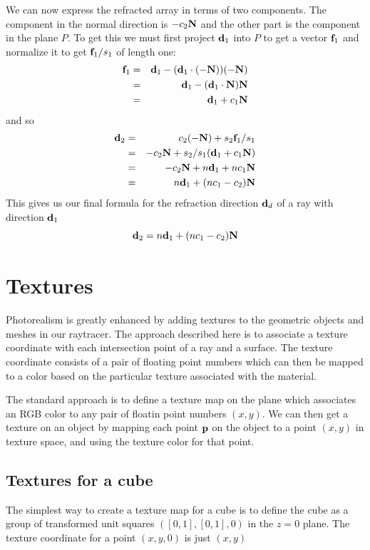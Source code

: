 \documentclass{book}
\newcommand{\vect}[1]{{\bf{ #1}}}
\begin{document}
We can now express the refracted array in terms of two components. The component in the normal
direction is $- c_2 {\vect N}$ and the other part is the component in the plane $P$. To get this
we must first project ${\vect d}_1$ into $P$ to get a vector $\vect{f}_1$
and normalize it to get $\vect{f}_1/s_1$ of length one:
\begin{eqnarray*}
{\vect f}_1 &=& {\vect d}_1 - ({\vect d}_1 \cdot (- {\vect N}))(- {\vect N}) \\
&=& {\vect d}_1 - ({\vect d}_1 \cdot  {\vect N}) {\vect N} \\
&=& {\vect d}_1 + c_1 {\vect N} \\
\end{eqnarray*}
and so
\begin{eqnarray*}
{\vect d}_2 &=& c_2 (- {\vect N}) + s_2 {\vect f_1}/s_1 \\
 &=& - c_2{\vect N} + s_2/s_1 ({\vect d}_1 + c_1{\vect N}) \\
 &=& - c_2{\vect N} + n {\vect d}_1 + n c_1 {\vect N} \\
 &=&  n {\vect d}_1 +  (n c_1 - c_2) {\vect N} \\
\end{eqnarray*}
This gives us our final formula for the refraction direction ${\vect d}_d$ of a ray with direction ${\vect d}_1$
\[
{\vect d}_2  =  n {\vect d}_1 +  (n c_1 - c_2) {\vect N}
\]

\chapter{Textures}

Photorealism is greatly enhanced by adding textures to the geometric objects
and meshes in our raytracer. The approach described here is to associate
a texture coordinate with each intersection point of a ray and a surface.
The texture coordinate consists of a pair of floating point numbers which can
then be mapped to a color based on the particular texture associated with the
material.

The standard approach is to define a texture map on the plane which associates
an RGB color to any pair of floatin point numbers $(x,y)$. We can then get a texture
on an object by mapping each point ${\vect p}$ on the object to a point $(x,y)$ in
texture space, and using the texture color for that point.


\section{Textures for a cube}
The simplest way to create a texture map for a cube is to define the cube as
a group of transformed unit squares $([0,1],[0,1],0)$ in the $z=0$ plane.
The texture coordinate for a point $(x,y,0)$ is just $(x,y)$
\end{document}
